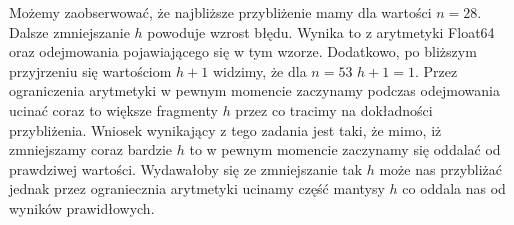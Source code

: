 \documentclass{article}
\begin{document}
Możemy zaobserwować, że najbliższe przybliżenie mamy dla wartości $n=28$. Dalsze zmniejszanie $h$ powoduje wzrost błędu. Wynika to z arytmetyki Float64 oraz odejmowania pojawiającego się w tym wzorze. Dodatkowo, po bliższym przyjrzeniu się wartościom $h+1$ widzimy, że dla $n=53$ $h+1=1$. Przez ograniczenia arytmetyki w pewnym momencie zaczynamy podczas odejmowania ucinać coraz to większe fragmenty $h$ przez co tracimy na dokładności przybliżenia. Wniosek wynikający z tego zadania jest taki, że mimo, iż zmniejszamy coraz bardzie $h$ to w pewnym momencie zaczynamy się oddalać od prawdziwej wartości. Wydawałoby się ze zmniejszanie tak $h$ może nas przybliżać jednak przez ograniecznia arytmetyki ucinamy część mantysy $h$ co oddala nas od wyników prawidłowych.
\end{document}
